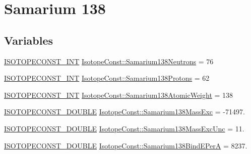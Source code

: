 \hypertarget{group___isotope_const-_samarium-_sm138}{}\section{Samarium 138}
\label{group___isotope_const-_samarium-_sm138}
\subsection*{Variables}
\begin{DoxyCompactItemize}
\item 
\mbox{\hyperlink{group___isotope_const-_macros_ga5f18360b3e99483a35c32d789e62621c}{I\+S\+O\+T\+O\+P\+E\+C\+O\+N\+S\+T\+\_\+\+I\+NT}} \mbox{\hyperlink{group___isotope_const-_samarium-_sm138_ga01a467299cd16bd79d2d97f20274ae52}{Isotope\+Const\+::\+Samarium138\+Neutrons}} = 76
\item 
\mbox{\hyperlink{group___isotope_const-_macros_ga5f18360b3e99483a35c32d789e62621c}{I\+S\+O\+T\+O\+P\+E\+C\+O\+N\+S\+T\+\_\+\+I\+NT}} \mbox{\hyperlink{group___isotope_const-_samarium-_sm138_gab804907a03edec77d61612ccc0fc2e40}{Isotope\+Const\+::\+Samarium138\+Protons}} = 62
\item 
\mbox{\hyperlink{group___isotope_const-_macros_ga5f18360b3e99483a35c32d789e62621c}{I\+S\+O\+T\+O\+P\+E\+C\+O\+N\+S\+T\+\_\+\+I\+NT}} \mbox{\hyperlink{group___isotope_const-_samarium-_sm138_ga8a84380e035b0abe734fba76b2826278}{Isotope\+Const\+::\+Samarium138\+Atomic\+Weight}} = 138
\item 
\mbox{\hyperlink{group___isotope_const-_macros_ga8f45a7272ce02c0b4c65c44636ed719a}{I\+S\+O\+T\+O\+P\+E\+C\+O\+N\+S\+T\+\_\+\+D\+O\+U\+B\+LE}} \mbox{\hyperlink{group___isotope_const-_samarium-_sm138_ga407bcc3334c550be50d13ddfa0026430}{Isotope\+Const\+::\+Samarium138\+Mass\+Exc}} = -\/71497.
\item 
\mbox{\hyperlink{group___isotope_const-_macros_ga8f45a7272ce02c0b4c65c44636ed719a}{I\+S\+O\+T\+O\+P\+E\+C\+O\+N\+S\+T\+\_\+\+D\+O\+U\+B\+LE}} \mbox{\hyperlink{group___isotope_const-_samarium-_sm138_gae1599d57e141d526582c35ba30cf98ee}{Isotope\+Const\+::\+Samarium138\+Mass\+Exc\+Unc}} = 11.
\item 
\mbox{\hyperlink{group___isotope_const-_macros_ga8f45a7272ce02c0b4c65c44636ed719a}{I\+S\+O\+T\+O\+P\+E\+C\+O\+N\+S\+T\+\_\+\+D\+O\+U\+B\+LE}} \mbox{\hyperlink{group___isotope_const-_samarium-_sm138_ga286ded554aa89c7aa09af31d4cb61207}{Isotope\+Const\+::\+Samarium138\+Bind\+E\+PerA}} = 8237.
\item 

\end{DoxyCompactItemize}
